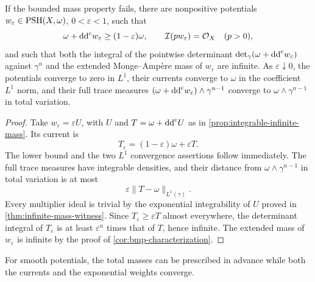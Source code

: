 \begin{corollary}\label{cor:strong-linear-infinite-mass}
If the bounded mass property fails, there are nonpositive potentials $w_\varepsilon\in\mathrm{PSH}(X,\omega)$, $0<\varepsilon<1$, such that
\[
 \omega+\mathrm{dd}^{\mathrm{c}} w_\varepsilon\geq(1-\varepsilon)\omega,
 \qquad
 \mathcal I(pw_\varepsilon)=\mathcal O_X\quad(p>0),
\]
and such that both the integral of the pointwise determinant $\det_\gamma(\omega+\mathrm{dd}^{\mathrm{c}} w_\varepsilon)$ against $\gamma^n$ and the extended Monge--Amp\`ere mass of $w_\varepsilon$ are infinite. As $\varepsilon\downarrow0$, the potentials converge to zero in $L^1$, their currents converge to $\omega$ in the coefficient $L^1$ norm, and their full trace measures $(\omega+\mathrm{dd}^{\mathrm{c}} w_\varepsilon)\wedge\gamma^{n-1}$ converge to $\omega\wedge\gamma^{n-1}$ in total variation.
\end{corollary}
\begin{proof}
Take $w_\varepsilon=\varepsilon U$, with $U$ and $T=\omega+\mathrm{dd}^{\mathrm{c}} U$ as in \cref{prop:integrable-infinite-mass}. Its current is
\[
 T_\varepsilon=(1-\varepsilon)\omega+\varepsilon T.
\]
The lower bound and the two $L^1$ convergence assertions follow immediately. The full trace measures have integrable densities, and their distance from $\omega\wedge\gamma^{n-1}$ in total variation is at most
\[
 \varepsilon\|T-\omega\|_{L^1(\gamma)}.
\]
Every multiplier ideal is trivial by the exponential integrability of $U$ proved in \cref{thm:infinite-mass-witness}. Since $T_\varepsilon\geq\varepsilon T$ almost everywhere, the determinant integral of $T_\varepsilon$ is at least $\varepsilon^n$ times that of $T$, hence infinite. The extended mass of $w_\varepsilon$ is infinite by the proof of \cref{cor:bmp-characterization}.
\end{proof}

For smooth potentials, the total masses can be prescribed in advance while both the currents and the exponential weights converge.


